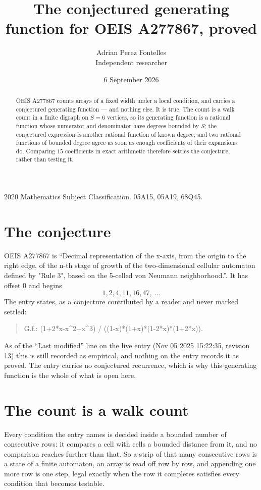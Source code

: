 \documentclass[11pt,a4paper]{article}
\title{The conjectured generating function for OEIS A277867, proved}
\author{Adrian Perez Fontelles\\ \small Independent researcher}
\date{6 September 2026}
\theoremstyle{plain}
\theoremstyle{definition}
\begin{document}
\maketitle

\begin{abstract}
OEIS A277867 counts arrays of a fixed width under a local condition, and carries a conjectured
generating function --- and nothing else. It is true. The count is a walk count in a finite
digraph on $S=6$ vertices, so its generating function is a rational function whose numerator
and denominator have degrees bounded by $S$; the conjectured expression is another rational
function of known degree; and two rational functions of bounded degree agree as soon as enough
coefficients of their expansions do. Comparing $15$ coefficients in exact arithmetic
therefore settles the conjecture, rather than testing it.
\end{abstract}

\noindent\small 2020 Mathematics Subject Classification. 05A15, 05A19, 68Q45.\normalsize

\section{The conjecture}

OEIS A277867 is ``Decimal representation of the x-axis, from the origin to the right edge, of the n-th stage of growth of the two-dimensional cellular automaton defined by "Rule 3", based on the 5-celled von Neumann neighborhood.''. It has offset $0$ and begins
\[
1, 2, 4, 11, 16, 47,\ \dots
\]
The entry states, as a conjecture contributed by a reader and never marked settled:
\begin{quote}
G.f.: (1+2*x-x\^{}2+x\^{}3) / ((1-x)*(1+x)*(1-2*x)*(1+2*x)).
\end{quote}
As of the ``Last modified'' line on the live entry (Nov 05 2025 15:22:35, revision 13) this is still
recorded as empirical, and nothing on the entry records it as proved. The entry carries no
conjectured recurrence, which is why this generating function is the whole of what is open
here.

\section{The count is a walk count}

Every condition the entry names is decided inside a bounded number of consecutive rows: it
compares a cell with cells a bounded distance from it, and no comparison reaches further than
that. So a strip of that many consecutive rows is a state of a finite automaton, an array is
read off row by row, and appending one more row is one step, legal exactly when the row it
completes satisfies every condition that becomes testable.
\end{document}

